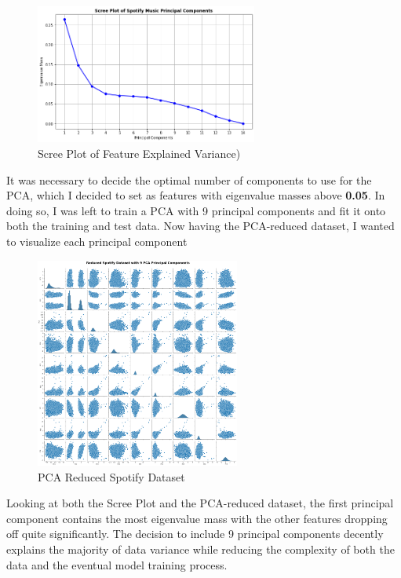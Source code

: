\documentclass[12pt]{article}
\begin{document}
\begin{figure}[htbp]
  \centering
  \vspace{-0.075cm}
  \includegraphics[width=0.65\textwidth]{pca_scree.png}
  \caption{Scree Plot of Feature Explained Variance)}
  \label{PCA Scree Plot}
\end{figure}

\noindent
It was necessary to decide the optimal number of components to use for the PCA, which I decided to set as features with eigenvalue masses above \textbf{0.05}. In doing so, I was left to train a PCA with 9 principal components and fit it onto both the training and test data. Now having the PCA-reduced dataset, I wanted to visualize each principal component

\begin{figure}[htbp]
  \centering
  \vspace{-0.075cm}
  \includegraphics[width=0.6\textwidth]{9_pca.png}
  \caption{PCA Reduced Spotify Dataset}
  \label{PCA Scree Plot}
\end{figure}

\noindent
Looking at both the Scree Plot and the PCA-reduced dataset, the first principal component contains the most eigenvalue mass with the other features dropping off quite significantly. The decision to include 9 principal components decently explains the majority of data variance while reducing the complexity of both the data and the eventual model training process.
\end{document}
